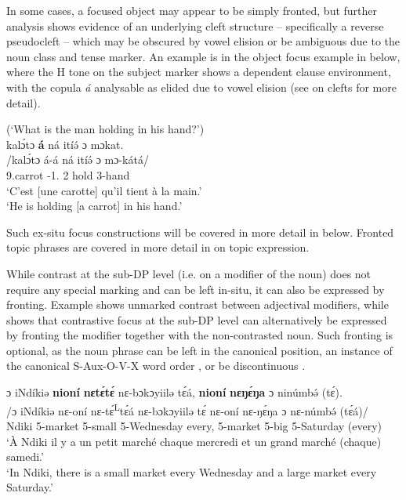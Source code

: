 \documentclass[output=paper,colorlinks,citecolor=brown
]{langscibook}
\begin{document}
In some cases, a focused object may appear to be simply fronted, but further analysis shows evidence of an underlying cleft structure -- specifically a reverse pseudocleft -- which may be obscured by vowel elision or be ambiguous due to the noun class and tense marker. An example is in the object focus example in  below, where the H tone on the subject marker shows a dependent clause environment, with the copula \textit{á} analysable as elided due to vowel elision (see  on clefts for more detail).\largerpage

\ea
\label{carrotcleft}
(`What is the man holding in his hand?') \\ 
\glll
{\db}kalɔ́tɔ \textbf{á} ná itíə́ ɔ mɔkat. \\
/kalɔ́tɔ á-á ná itíə́ ɔ mɔ-kátá/ \\
{\db}9.carrot \COP{}-1\SM{}.\REL{} \PST{}2{} hold \PREP{} 3-hand \\
\glt
`C'est [une carotte]\textsubscript{\FOC{}} qu'il tient à la main.' \\ `He is holding [a carrot]\textsubscript{\FOC{}} in his hand.' \jambox*{[JO 1630] }

\z

Such ex-situ focus constructions will be covered in more detail in  below. Fronted topic phrases are covered in more detail in  on topic expression.

While contrast at the sub-DP level (i.e. on a modifier of the noun) does not require any special marking and can be left in-situ, it can also be expressed by fronting. Example  shows unmarked contrast between adjectival modifiers, while  shows that contrastive focus at the sub-DP level can alternatively be expressed by fronting the modifier together with the non-contrasted noun. Such fronting is optional, as the noun phrase can be left in the canonical position, an instance of the canonical S-Aux-O-V-X word order , or be discontinuous .

\ea
\label{nomarkcontrast}
\glll
{\db}ɔ	iNdíkiə	\textbf{nioní}	\textbf{nɛtɛ́\ds{}tɛ́}	nɛ-bɔkɔyiilə tɛ́á,	\textbf{nioní}	\textbf{nɛŋɛ́ŋa}	ɔ	ninúmbə́	(tɛ́). \\
/ɔ	iNdíkiə	nɛ-oní	nɛ-tɛ́\textsuperscript{L}tɛ́á	nɛ-bɔkɔyiilə tɛ́	nɛ-oní	nɛ-ŋɛ́ŋa	ɔ	nɛ-númbə́	(tɛ́á)/ \\
{\db}\PREP{}	Ndiki	5-market	5-small	5-Wednesday every,	5-market	5-big	\PREP{}	5-Saturday	(every) \\
\glt
`À Ndiki il y a un petit marché chaque mercredi et un grand marché (chaque) samedi.' \\ `In Ndiki, there is a small market every Wednesday and a large market every Saturday.' \jambox*{[PM 193] }
\end{document}
